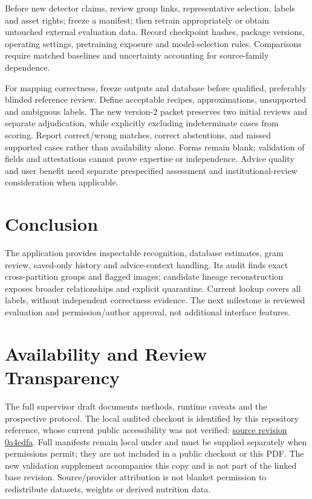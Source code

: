 \documentclass[conference]{IEEEtran}
\newcommand{\code}[1]{\texttt{\detokenize{#1}}}
\begin{document}
Before new detector claims, review group links, representative selection, labels and asset rights; freeze a manifest; then retrain appropriately or obtain untouched external evaluation data. Record checkpoint hashes, package versions, operating settings, pretraining exposure and model-selection rules. Comparisons require matched baselines and uncertainty accounting for source-family dependence.

For mapping correctness, freeze outputs and database before qualified, preferably blinded reference review. Define acceptable recipes, approximations, unsupported and ambiguous labels. The new version-2 packet preserves two initial reviews and separate adjudication, while explicitly excluding indeterminate cases from scoring. Report correct/wrong matches, correct abstentions, and missed supported cases rather than availability alone. Forms remain blank; validation of fields and attestations cannot prove expertise or independence. Advice quality and user benefit need separate prespecified assessment and institutional-review consideration when applicable.

\section{Conclusion}
The application provides inspectable recognition, database estimates, gram review, saved-only history and advice-context handling. Its audit finds \AuditDuplicateGroups{} exact cross-partition groups and \AuditFlaggedImages{} flagged images; candidate lineage reconstruction exposes broader relationships and explicit quarantine. Current lookup covers all \AuditClasses{} labels, without independent correctness evidence. The next milestone is reviewed evaluation and permission/author approval, not additional interface features.

\section*{Availability and Review Transparency}
The full supervisor draft documents methods, runtime caveats and the prospective protocol. The local audited checkout is identified by this repository reference, whose current public accessibility was not verified:
\href{https://github.com/jaspreet-jt-singh/Final_Year_Project/tree/0a4edfa92818945ccd7f16b023299c847c745f0d}{source revision 0a4edfa}.
Full manifests remain local under \code{.deployment/research/} and must be supplied separately when permissions permit; they are not included in a public checkout or this PDF. The new validation supplement accompanies this copy and is not part of the linked base revision. Source/provider attribution is not blanket permission to redistribute datasets, weights or derived nutrition data.
\end{document}
